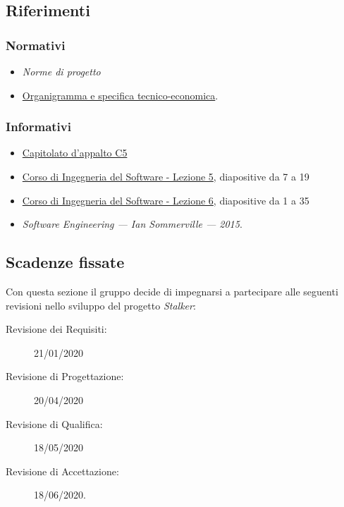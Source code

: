 \documentclass[../piano-di-progetto.tex]{subfiles}
\begin{document}
\subsection{Riferimenti}%
\label{sub:riferimenti}
\subsubsection{Normativi}%
\label{subs:normativi}
\begin{itemize}
  \item \textit{Norme di progetto}
  \item \href{https://www.math.unipd.it/~tullio/IS-1/2019/Progetto/RO.html}{Organigramma e specifica tecnico-economica}.
\end{itemize}
\subsubsection{Informativi}%
\label{subs:informativi}
\begin{itemize}
  \item \href{https://www.math.unipd.it/~tullio/IS-1/2019/Progetto/C5.pdf}{Capitolato d'appalto C5}
  \item \href{https://www.math.unipd.it/~tullio/IS-1/2019/Dispense/L05.pdf}{Corso di Ingegneria del Software - Lezione 5}, diapositive da 7 a 19
  \item \href{https://www.math.unipd.it/~tullio/IS-1/2019/Dispense/L06.pdf}{Corso di Ingegneria del Software - Lezione 6}, diapositive da 1 a 35
  \item \textit{Software Engineering --- Ian Sommerville --- 2015}.
\end{itemize}%
\subsection{Scadenze fissate}%
\label{sub:scadenze_fissate}
Con questa sezione il gruppo decide di impegnarsi a partecipare alle seguenti revisioni nello sviluppo del progetto \textit{Stalker}:
  \begin{description}
    \item[Revisione dei Requisiti:] 21/01/2020
    \item[Revisione di Progettazione:] 20/04/2020
    \item[Revisione di Qualifica:] 18/05/2020
    \item[Revisione di Accettazione:] 18/06/2020.
  \end{description}
\end{document}
